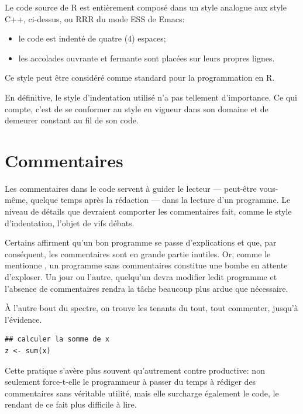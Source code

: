 Le code source de R est entièrement composé dans un style analogue aux
style C++, ci-dessus, ou RRR du mode ESS de Emacs:
\begin{itemize}
\item le code est indenté de quatre (4) espaces;
\item les accolades ouvrante et fermante sont placées sur leurs
  propres lignes.
\end{itemize}
Ce style peut être  considéré comme standard pour la programmation en
R.

En définitive, le style d'indentation utilisé n'a pas tellement
d'importance. Ce qui compte, c'est de se conformer au style en vigueur
dans son domaine et de demeurer constant au fil de son code.



\section{Commentaires}
\label{sec:collaboration:commentaires}

Les commentaires dans le code servent à guider le lecteur ---
peut-être vous-même, quelque temps après la rédaction --- dans la
lecture d'un programme. Le niveau de détails que devraient comporter
les commentaires fait, comme le style d'indentation, l'objet de vifs
débats.

Certains affirment qu'un bon programme se passe d'explications et que,
par conséquent, les commentaires sont en grande partie inutiles. Or,
comme le mentionne \citet{Oualline:C:1997}, un programme sans
commentaires constitue une bombe en attente d'exploser. Un jour ou
l'autre, quelqu'un devra modifier ledit programme et l'absence de
commentaires rendra la tâche beaucoup plus ardue que nécessaire.

À l'autre bout du spectre, on trouve les tenants du tout, tout
commenter, jusqu'à l'évidence.
\begin{Schunk}
\begin{Verbatim}
## calculer la somme de x
z <- sum(x)
\end{Verbatim}
\end{Schunk}
Cette pratique s'avère plus souvent qu'autrement contre productive:
non seulement force-t-elle le programmeur à passer du temps à rédiger
des commentaires sans véritable utilité, mais elle surcharge également
le code, le rendant de ce fait plus difficile à lire.

